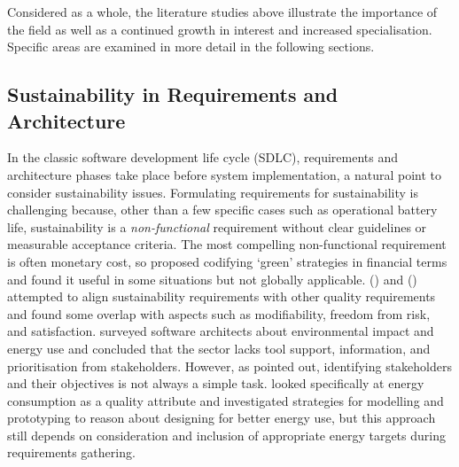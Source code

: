 Considered as a whole, the literature studies above illustrate the importance of the field as well as a continued growth in interest and increased specialisation. Specific areas are examined in more detail in the following sections.

\subsection{Sustainability in Requirements and Architecture}
\label{literature:requirements}

In the classic software development life cycle (SDLC), requirements and architecture phases take place before system implementation, a natural point to consider sustainability issues. Formulating requirements for sustainability is challenging because, other than a few specific cases such as operational battery life, sustainability is a \emph{non-functional} requirement without clear guidelines or measurable acceptance criteria. The most compelling non-functional requirement is often monetary cost, so \citet{Gu2012} proposed codifying `green' strategies in financial terms and found it useful in some situations but not globally applicable. \citeauthor{Condori-Fernandez2018} (\citeyear{Condori-Fernandez2015}) and (\citeyear{Condori-Fernandez2018}) attempted to align sustainability requirements with other quality requirements and found some overlap with aspects such as modifiability, freedom from risk, and satisfaction. \citet{Bashroush2016} surveyed software architects about environmental impact and energy use and concluded that the sector lacks tool support, information, and prioritisation from stakeholders. However, as \citet{Penzenstadler2013a} pointed out, identifying stakeholders and their objectives is not always a simple task. \citet{Kazman2018} looked specifically at energy consumption as a quality attribute and investigated strategies for modelling and prototyping to reason about designing for better energy use, but this approach still depends on consideration and inclusion of appropriate energy targets during requirements gathering.

